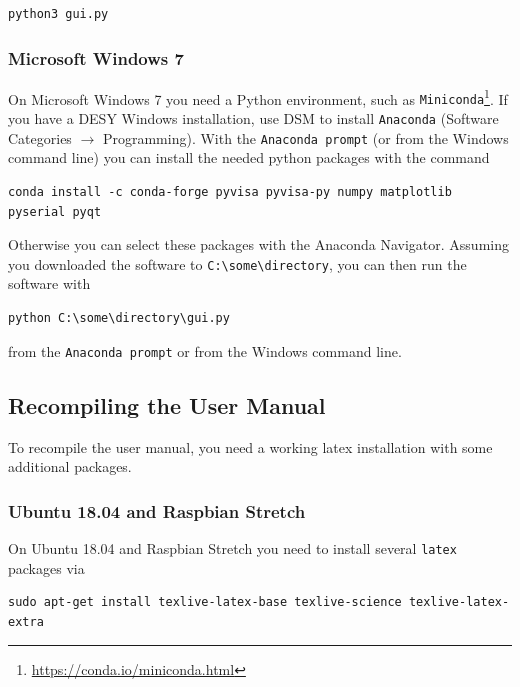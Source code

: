 \documentclass[a4paper]{article}
\begin{document}
\medskip
\begin{lstlisting}
python3 gui.py
\end{lstlisting}
\medskip

\subsubsection{Microsoft Windows 7}

On Microsoft Windows 7 you need a Python environment, such as {\tt Miniconda}\footnote{\href{https://conda.io/miniconda.html}{https://conda.io/miniconda.html}}.
If you have a DESY Windows installation, use DSM to install {\tt Anaconda} (Software Categories $\rightarrow$ Programming).
With the {\tt Anaconda prompt} (or from the Windows command line) you can install the needed python packages with the command

\medskip
\begin{lstlisting}
conda install -c conda-forge pyvisa pyvisa-py numpy matplotlib pyserial pyqt
\end{lstlisting}
\medskip

Otherwise you can select these packages with the Anaconda Navigator.
Assuming you downloaded the software to {\tt C:\textbackslash some\textbackslash directory}, you can then run the software with

\medskip
\begin{lstlisting}
python C:\some\directory\gui.py
\end{lstlisting}
\medskip

from the {\tt Anaconda prompt} or from the Windows command line.

\subsection{Recompiling the User Manual}

To recompile the user manual, you need a working latex installation with some additional packages.

\subsubsection{Ubuntu 18.04 and Raspbian Stretch}

On Ubuntu 18.04 and Raspbian Stretch you need to install several {\tt latex} packages via

\medskip
\begin{lstlisting}
sudo apt-get install texlive-latex-base texlive-science texlive-latex-extra
\end{lstlisting}
\medskip
\end{document}
